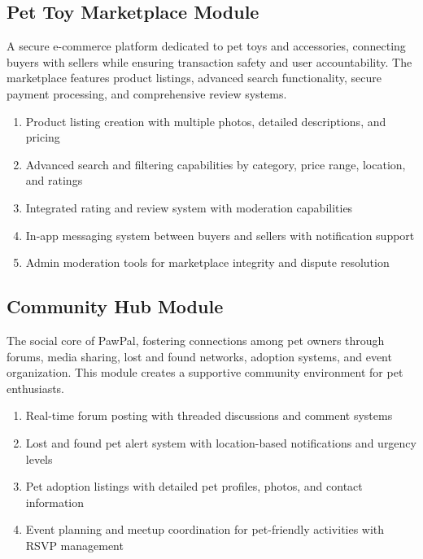 \subsection{Pet Toy Marketplace Module}
A secure e-commerce platform dedicated to pet toys and accessories, connecting buyers with sellers while ensuring transaction safety and user accountability. The marketplace features product listings, advanced search functionality, secure payment processing, and comprehensive review systems.
\begin{enumerate}
    \item Product listing creation with multiple photos, detailed descriptions, and pricing
    \item Advanced search and filtering capabilities by category, price range, location, and ratings
    \
    \item Integrated rating and review system with moderation capabilities
    \item In-app messaging system between buyers and sellers with notification support
    \item Admin moderation tools for marketplace integrity and dispute resolution
 
\end{enumerate}

\subsection{Community Hub Module}
The social core of PawPal, fostering connections among pet owners through forums, media sharing, lost and found networks, adoption systems, and event organization. This module creates a supportive community environment for pet enthusiasts. 
\begin{enumerate}
    \item Real-time forum posting with threaded discussions and comment systems
    \item Lost and found pet alert system with location-based notifications and urgency levels
    \item Pet adoption listings with detailed pet profiles, photos, and contact information
    \item Event planning and meetup coordination for pet-friendly activities with RSVP management
    
\end{enumerate}

